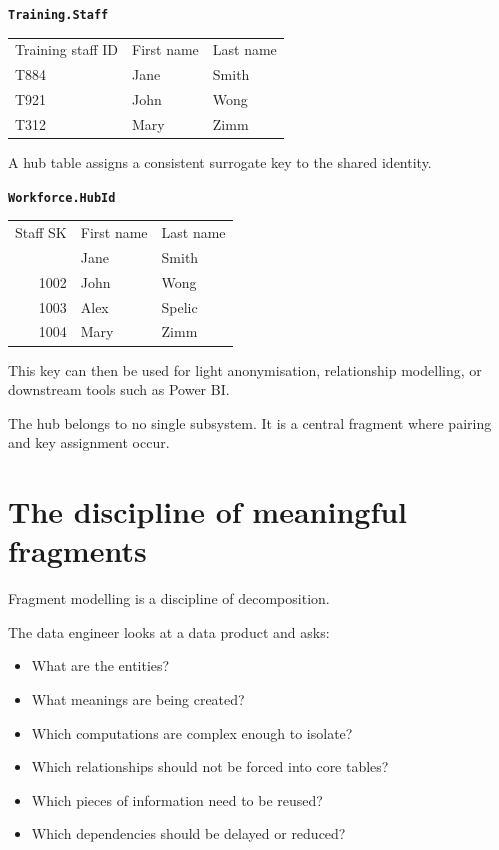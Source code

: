 \documentclass[10pt,openany,10pt]{book}
\providecommand{\tightlist}{%
  \setlength{\itemsep}{0pt}\setlength{\parskip}{0pt}}
\newcounter{none}
\let\podeToprule\toprule
\let\podeMidrule\midrule
\let\podeBottomrule\bottomrule
\renewcommand{\toprule}{\arrayrulecolor{pbiGrid}\podeToprule}
\renewcommand{\midrule}{\arrayrulecolor{pbiGrid}\podeMidrule}
\renewcommand{\bottomrule}{\arrayrulecolor{pbiGrid}\podeBottomrule}
\begin{document}
\textbf{\texttt{Training.Staff}}

{\def\LTcaptype{none} %
\begin{longtable}[]{@{}lll@{}}
\toprule\noalign{}
Training staff ID & First name & Last name \\
\midrule\noalign{}
\endhead
\bottomrule\noalign{}
\endlastfoot
T884 & Jane & Smith \\
T921 & John & Wong \\
T312 & Mary & Zimm \\
\end{longtable}
}

A hub table assigns a consistent surrogate key to the shared identity.

\textbf{\texttt{Workforce.HubId}}

{\def\LTcaptype{none} %
\begin{longtable}[]{@{}rll@{}}
\toprule\noalign{}
Staff SK & First name & Last name \\
\midrule\noalign{}
\endhead
\bottomrule\noalign{}
\endlastfoot
1001 & Jane & Smith \\
1002 & John & Wong \\
1003 & Alex & Spelic \\
1004 & Mary & Zimm \\
\end{longtable}
}

This key can then be used for light anonymisation, relationship
modelling, or downstream tools such as Power BI.

The hub belongs to no single subsystem. It is a central fragment where
pairing and key assignment occur.

\section{The discipline of meaningful
fragments}\label{the-discipline-of-meaningful-fragments}

Fragment modelling is a discipline of decomposition.

The data engineer looks at a data product and asks:

\begin{itemize}
\tightlist
\item
  What are the entities?
\item
  What meanings are being created?
\item
  Which computations are complex enough to isolate?
\item
  Which relationships should not be forced into core tables?
\item
  Which pieces of information need to be reused?
\item
  Which dependencies should be delayed or reduced?
\end{itemize}
\end{document}
